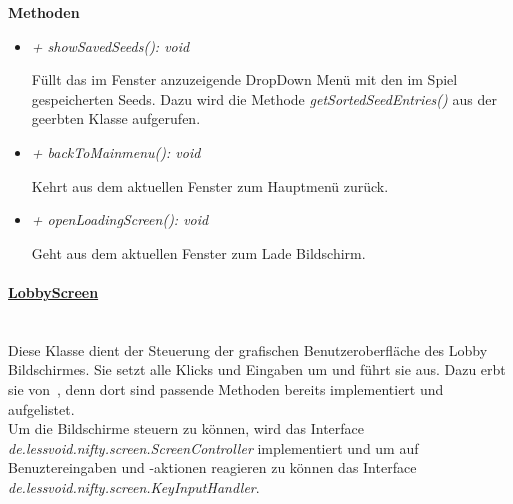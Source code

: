             \textbf{Methoden}					
            \begin{itemize}
                \item  \textit{+ showSavedSeeds(): void} 
                    \begin{leftbar}[0.9\linewidth]
                        Füllt das im Fenster anzuzeigende DropDown Menü mit den im Spiel
                        gespeicherten Seeds. Dazu wird die Methode \textit{getSortedSeedEntries()} aus
                        der geerbten Klasse aufgerufen. \\
                    \end{leftbar}
                \item  \textit{+ backToMainmenu(): void} 
                    \begin{leftbar}[0.9\linewidth]
                        Kehrt aus dem aktuellen Fenster zum Hauptmenü zurück.\\
                    \end{leftbar}
                \item  \textit{+ openLoadingScreen(): void} 
                    \begin{leftbar}[0.9\linewidth]
                        Geht aus dem aktuellen Fenster zum Lade Bildschirm.\\
                    \end{leftbar}
            \end{itemize}        
        
        \paragraph{\underline{LobbyScreen}} \mbox{}\\
            Diese Klasse dient der Steuerung der grafischen Benutzeroberfläche
            des Lobby Bildschirmes. Sie setzt alle Klicks und Eingaben
            um und führt sie aus. Dazu erbt sie von~, denn dort
            sind passende Methoden bereits implementiert und aufgelistet.\\
            Um die Bildschirme steuern zu können, wird das Interface
            \textit{de.lessvoid.nifty.screen.ScreenController} implementiert und um auf
            Benuztereingaben und -aktionen reagieren zu können das Interface
            \textit{de.lessvoid.nifty.screen.KeyInputHandler}. \par
            
